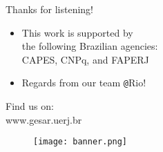 \begin{frame}[t]{Thanks for listening!}
\begin{itemize}
\item {\small This work is supported by \\ 
the following Brazilian agencies: \\ 
CAPES, CNPq, and FAPERJ }
\item {\small Regards from our team \texttt{@}Rio!}
\end{itemize}
	\begin{varblock}[0.4\textwidth]{}	
	\begin{center}	
	{ \Large 
	{ \color[rgb]{0.5,0,0} Find us on: \\
	\textsf{www.gesar.uerj.br} } }
	\end{center}
	\end{varblock}
	\begin{figure}[t]
	\flushright
	\vspace{-5cm}
	\texttt{[image: banner.png]}
	\end{figure}
\end{frame}
